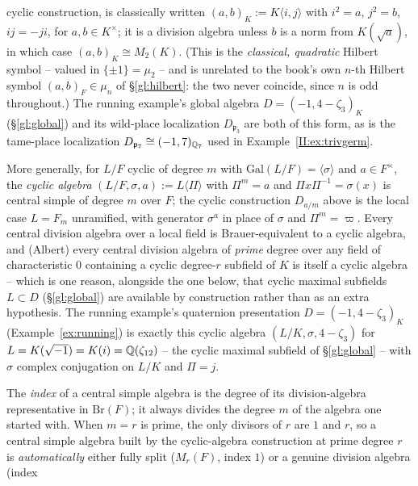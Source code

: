 \begin{description}
cyclic construction, is classically written $(a,b)_K:=K\langle
i,j\rangle$ with $i^2=a$, $j^2=b$, $ij=-ji$, for $a,b\in K^\times$; it
is a division algebra unless $b$ is a norm from $K(\sqrt a)$, in
which case $(a,b)_K\cong M_2(K)$. (This is the \emph{classical,
quadratic} Hilbert symbol -- valued in $\{\pm1\}=\mu_2$ -- and is
unrelated to the book's own $n$-th Hilbert symbol $(a,b)_F\in\mu_n$
of \S\ref{gl:hilbert}: the two never coincide, since $n$ is odd
throughout.) The running example's global algebra
$D=(-1,4-\zeta_3)_K$ (\S\ref{gl:global}) and its wild-place
localization $D_{\mathfrak p_3}$ are both of this form, as is the
tame-place localization $D_{\mathfrak p_7}\cong(-1,7)_{\mathbb{Q}_7}$ used in
Example~\ref{II:ex:trivgerm}.
\item[Cyclic algebras] More generally, for $L/F$ cyclic of degree $m$
with $\mathrm{Gal}(L/F)=\langle\sigma\rangle$ and $a\in F^\times$, the
\emph{cyclic algebra} $(L/F,\sigma,a):=L\langle\Pi\rangle$ with
$\Pi^m=a$ and $\Pi x\Pi^{-1}=\sigma(x)$ is central simple of degree
$m$ over $F$; the cyclic construction $D_{a/m}$ above is the local case
$L=F_m$ unramified, with generator $\sigma^a$ in place of $\sigma$ and $\Pi^m=\varpi$. Every central division algebra over a
local field is Brauer-equivalent to a cyclic algebra, and (Albert)
every central division algebra of \emph{prime} degree over any field
of characteristic $0$ containing a cyclic degree-$r$ subfield of $K$
is itself a cyclic algebra -- which is one reason, alongside the one
below, that cyclic maximal subfields $L\subset D$ (\S\ref{gl:global})
are available by construction rather than as an extra hypothesis.
The running example's quaternion presentation
$D=(-1,4-\zeta_3)_K$ (Example~\ref{ex:running}) is exactly this cyclic
algebra $(L/K,\sigma,4-\zeta_3)$ for $L=K(\sqrt{-1})=K(i)=\mathbb{Q}(\zeta_{12})$
-- the cyclic maximal subfield of \S\ref{gl:global} -- with $\sigma$
complex conjugation on $L/K$ and $\Pi=j$.
\item[Why prime degree] The \emph{index} of a central simple
algebra is the degree of its division-algebra representative in
$\mathrm{Br}(F)$; it always divides the degree $m$ of the algebra one
started with. When $m=r$ is prime, the only divisors of $r$ are $1$
and $r$, so a central simple algebra built by the cyclic-algebra
construction at prime degree $r$ is \emph{automatically} either fully
split ($M_r(F)$, index $1$) or a genuine division algebra (index

\end{description}
